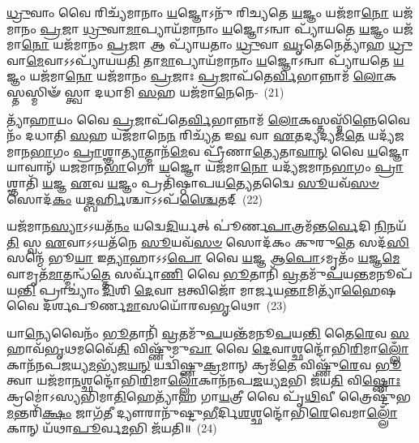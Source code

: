 {\anuvakamend[{\-\ul{𑌦}\-\-\ul{𑌰𑍍}\-\mbox{}\-\ul{𑌶}\-\-\ul{𑌪𑍂}\-\-\ul{𑌰𑍍𑌣}\-\-\ul{𑌮𑌾}\-𑌸𑌯𑍋᳴𑌰𑍁\-\ul{𑌭}\-𑌯𑌤𑍋᳴ 𑌦𑍇\-\ul{𑌵𑌾}\-𑌶𑍍𑌵𑌾𑌃 \ul{𑌸𑍁}\-𑌰𑍇𑌤𑌾𑌃॑ \ul{𑌪𑍍𑌰}\-𑌜𑌾𑌪᳴𑌤𑌿𑌰𑍍𑌮𑌿\-\ul{𑌥𑍁}\-𑌨𑍇𑌨𑌾॑\-𑌽\-𑌽𑌪𑍍𑌨𑍋\-\ul{𑌤𑍍𑌯}\-𑌷𑍍𑌟𑍗 𑌚᳴}]}%

\-\ul{𑌧𑍍𑌰𑍁}\-𑌵𑌾𑌂 𑌵𑍈 𑌰𑌿𑌚𑍍𑌯᳴𑌮𑌾𑌨𑌾𑌂 \ul{𑌯}\-𑌜𑍍𑌞𑍋\-𑌽𑌨𑍁᳴ 𑌰𑌿𑌚𑍍𑌯𑌤𑍇 \ul{𑌯}\-𑌜𑍍𑌞𑌂 𑌯𑌜᳴𑌮𑌾\-\ul{𑌨𑍋} 𑌯𑌜᳴𑌮𑌾𑌨𑌂 \ul{𑌪𑍍𑌰}\-𑌜𑌾 \ul{𑌧𑍍𑌰𑍁}\-𑌵𑌾\-\ul{𑌮𑌾}\-𑌪𑍍𑌯𑌾𑌯᳴𑌮𑌾𑌨𑌾𑌂 \ul{𑌯}\-𑌜𑍍𑌞𑍋\-𑌽𑌨𑍍𑌵𑌾 𑌪𑍍𑌯𑌾᳴𑌯𑌤𑍇 \ul{𑌯}\-𑌜𑍍𑌞𑌂 𑌯𑌜᳴𑌮𑌾\-\ul{𑌨𑍋} 𑌯𑌜᳴𑌮𑌾𑌨𑌂 \ul{𑌪𑍍𑌰}\-𑌜𑌾 𑌆 𑌪𑍍𑌯𑌾᳴𑌯𑌤𑌾𑌂 \ul{𑌧𑍍𑌰𑍁}\-𑌵𑌾 \ul{𑌘𑍃}\-𑌤𑍇𑌨𑍇𑌤𑍍𑌯𑌾᳴𑌹 \ul{𑌧𑍍𑌰𑍁}\-𑌵𑌾\-\ul{𑌮𑍇}\-𑌵𑌾\-𑌽\-𑌽𑌪𑍍𑌯𑌾᳴𑌯𑌯\-\ul{𑌤𑌿} 𑌤𑌾\-\ul{𑌮𑌾}\-𑌪𑍍𑌯𑌾𑌯᳴𑌮𑌾𑌨𑌾𑌂 \ul{𑌯}\-𑌜𑍍𑌞𑍋\-𑌽𑌨𑍍𑌵𑌾 𑌪𑍍𑌯𑌾᳴𑌯𑌤𑍇 \ul{𑌯}\-𑌜𑍍𑌞𑌂 𑌯𑌜᳴𑌮𑌾\-\ul{𑌨𑍋} 𑌯𑌜᳴𑌮𑌾𑌨𑌂 \ul{𑌪𑍍𑌰}\-𑌜𑌾𑌃 \ul{𑌪𑍍𑌰}\-𑌜𑌾𑌪᳴𑌤𑍇\-\ul{𑌰𑍍𑌵𑌿}\-𑌭𑌾𑌨𑍍𑌨𑌾𑌮᳴ \ul{𑌲𑍋}\-𑌕𑌸𑍍𑌤𑌸𑍍𑌮𑌿𑍟᳴ 𑌸𑍍𑌤𑍍𑌵𑌾 𑌦𑌧𑌾𑌮𑌿 \ul{𑌸}\-𑌹 𑌯𑌜᳴𑌮𑌾\-\ul{𑌨𑍇}\-𑌨𑍇-~(21)

𑌤𑍍𑌯𑌾᳴\-\ul{𑌹𑌾}\-𑌯𑌂 𑌵𑍈 \ul{𑌪𑍍𑌰}\-𑌜𑌾𑌪᳴𑌤𑍇\-\ul{𑌰𑍍𑌵𑌿}\-𑌭𑌾𑌨𑍍𑌨𑌾𑌮᳴ \ul{𑌲𑍋}\-𑌕𑌸𑍍𑌤𑌸𑍍𑌮𑌿᳴\-\ul{𑌨𑍍𑌨𑍇}\-𑌵𑍈𑌨𑌂᳴ 𑌦𑌧𑌾𑌤𑌿 \ul{𑌸}\-𑌹 𑌯𑌜᳴𑌮𑌾𑌨𑍇\-\ul{𑌨} 𑌰𑌿𑌚𑍍𑌯᳴𑌤 𑌇\-\ul{𑌵} 𑌵𑌾 \ul{𑌏}\-𑌤𑌦𑍍𑌯𑌦𑍍𑌯𑌜᳴\-\ul{𑌤𑍇} 𑌯𑌦𑍍𑌯᳴𑌜𑌮𑌾𑌨\-\ul{𑌭𑌾}\-𑌗𑌂 \ul{𑌪𑍍𑌰𑌾}\-𑌶𑍍𑌞𑌾\-\ul{𑌤𑍍𑌯𑌾}\-𑌤𑍍𑌮𑌾𑌨᳴\-\ul{𑌮𑍇}\-𑌵 𑌪𑍍𑌰𑍀᳴𑌣𑌾\-\ul{𑌤𑍍𑌯𑍇}\-𑌤𑌾\-\ul{𑌵𑌾}\-\-\ul{𑌨𑍍} 𑌵𑍈 \ul{𑌯}\-𑌜𑍍𑌞𑍋 𑌯𑌾𑌵𑌾𑌨𑍍᳴ 𑌯𑌜𑌮𑌾𑌨\-\ul{𑌭𑌾}\-𑌗𑍋 \ul{𑌯}\-𑌜𑍍𑌞𑍋 𑌯𑌜᳴𑌮𑌾\-\ul{𑌨𑍋} 𑌯𑌦𑍍𑌯᳴𑌜𑌮𑌾𑌨\-\ul{𑌭𑌾}\-𑌗𑌂 \ul{𑌪𑍍𑌰𑌾}\-𑌶𑍍𑌞𑌾𑌤𑌿᳴ \ul{𑌯}\-𑌜𑍍𑌞 \ul{𑌏}\-𑌵 \ul{𑌯}\-𑌜𑍍𑌞𑌂 𑌪𑍍𑌰𑌤𑌿᳴𑌷𑍍𑌠𑌾𑌪𑌯\-\ul{𑌤𑍍𑌯𑍇}\-𑌤𑌦𑍍𑌵𑍈 \ul{𑌸𑍂}\-𑌯𑌵᳴\-\ul{𑌸}\-\-\ul{𑍞} 𑌸𑍋𑌦᳴\-\ul{𑌕𑌂} 𑌯\-\ul{𑌦𑍍𑌬}\-\-\ul{𑌰𑍍}\-\mbox{}𑌹𑌿𑌶𑍍𑌚𑌾\-𑌽\-𑌽𑌪᳴\-\ul{𑌶𑍍𑌚𑍈}\-𑌤𑌦𑍍~(22)

𑌯𑌜᳴𑌮𑌾𑌨\-\ul{𑌸𑍍𑌯𑌾}\-\-𑌽\-𑌽𑌯𑌤᳴\-\ul{𑌨𑌂} 𑌯𑌦𑍍𑌵𑍇\-\ul{𑌦𑌿}\-𑌰𑍍𑌯𑌤𑍍 𑌪𑍂॑𑌰𑍍𑌣\-\ul{𑌪𑌾}\-𑌤𑍍𑌰𑌮᳴𑌨𑍍𑌤\-\ul{𑌰𑍍𑌵𑍇}\-𑌦𑌿 \ul{𑌨𑌿}\-𑌨𑌯᳴\-\ul{𑌤𑌿} 𑌸𑍍𑌵 \ul{𑌏}\-𑌵𑌾\-𑌽\-𑌽𑌯𑌤᳴𑌨𑍇 \ul{𑌸𑍂}\-𑌯𑌵᳴\-\ul{𑌸}\-\-\ul{𑍞} 𑌸𑍋𑌦᳴𑌕𑌂 𑌕𑍁𑌰𑍁\-\ul{𑌤𑍇} 𑌸𑌦᳴\-\ul{𑌸𑌿} 𑌸𑌨𑍍𑌮𑍇᳴ 𑌭𑍂\-\ul{𑌯𑌾} 𑌇\-\ul{𑌤𑍍𑌯𑌾}\-𑌹𑌾\-𑌽\-𑌽\-\ul{𑌪𑍋} 𑌵𑍈 \ul{𑌯}\-𑌜𑍍𑌞 𑌆\-\ul{𑌪𑍋}\-\-𑌽𑌮𑍃𑌤𑌂᳴ \ul{𑌯}\-𑌜𑍍𑌞\-\ul{𑌮𑍇}\-𑌵𑌾𑌮𑍃𑌤᳴\-\ul{𑌮𑌾}\-𑌤𑍍𑌮𑌨𑍍𑌧᳴\-\ul{𑌤𑍍𑌤𑍇} 𑌸𑌰𑍍𑌵𑌾᳴\-\ul{𑌣𑌿} 𑌵𑍈 \ul{𑌭𑍂}\-𑌤𑌾𑌨𑌿᳴ \ul{𑌵𑍍𑌰}\-𑌤𑌮𑍁᳴\-\ul{𑌪}\-𑌯\-\ul{𑌨𑍍𑌤}\-𑌮𑌨𑍂𑌪᳴ 𑌯\-\ul{𑌨𑍍𑌤𑌿} 𑌪𑍍𑌰𑌾𑌚𑍍𑌯𑌾𑌂॑ \ul{𑌦𑌿}\-𑌶𑌿 \ul{𑌦𑍇}\-𑌵𑌾 \ul{𑌋}\-𑌤𑍍𑌵𑌿𑌜𑍋᳴ 𑌮𑌾𑌰𑍍𑌜𑌯\-\ul{𑌨𑍍𑌤𑌾}\-𑌮𑌿𑌤𑍍𑌯𑌾᳴\-\ul{𑌹𑍈}\-𑌷 𑌵𑍈 𑌦᳴𑌰𑍍\mbox{}𑌶𑌪𑍂𑌰𑍍𑌣\-\ul{𑌮𑌾}\-𑌸𑌯𑍋᳴𑌰𑌵\-\ul{𑌭𑍃}\-𑌥𑍋~(23)

𑌯𑌾\-\ul{𑌨𑍍𑌯𑍇}\-𑌵𑍈𑌨𑌂᳴ \ul{𑌭𑍂}\-𑌤𑌾𑌨𑌿᳴ \ul{𑌵𑍍𑌰}\-𑌤𑌮𑍁᳴\-\ul{𑌪}\-𑌯𑌨𑍍𑌤᳴𑌮𑌨𑍂\-\ul{𑌪}\-𑌯\-\ul{𑌨𑍍𑌤𑌿} 𑌤𑍈\-\ul{𑌰𑍇}\-𑌵 \ul{𑌸}\-𑌹𑌾𑌵᳴\-\ul{𑌭𑍃}\-𑌥𑌮𑌵𑍈᳴\-\ul{𑌤𑌿} 𑌵𑌿𑌷𑍍𑌣𑍁᳴𑌮𑍁\-\ul{𑌖𑌾} 𑌵𑍈 \ul{𑌦𑍇}\-𑌵𑌾𑌶𑍍𑌛𑌨𑍍𑌦𑍋᳴𑌭𑌿\-\ul{𑌰𑌿}\-𑌮𑌾\-\ul{𑌲𑍍𑌲𑍋𑌁}\-𑌕𑌾𑌨᳴𑌨𑌪\-\-\ul{𑌜}\-𑌯𑍍𑌯\-\ul{𑌮}\-𑌭𑍍𑌯᳴𑌜\-\ul{𑌯}\-\-\ul{𑌨𑍍} 𑌯𑌦𑍍𑌵𑌿᳴𑌷𑍍𑌣𑍁\-\ul{𑌕𑍍𑌰}\-𑌮𑌾𑌨𑍍 𑌕𑍍𑌰𑌮᳴\-\ul{𑌤𑍇} 𑌵𑌿𑌷𑍍𑌣𑍁᳴\-\ul{𑌰𑍇}\-𑌵 \ul{𑌭𑍂}\-𑌤𑍍𑌵𑌾 𑌯𑌜᳴𑌮𑌾\-\ul{𑌨}\-𑌶𑍍𑌛𑌨𑍍𑌦𑍋᳴𑌭𑌿\-\ul{𑌰𑌿}\-𑌮𑌾\-\ul{𑌲𑍍𑌲𑍋𑌁}\-𑌕𑌾𑌨᳴𑌨𑌪\-\ul{𑌜}\-𑌯𑍍𑌯\-\ul{𑌮}\-𑌭𑌿 𑌜᳴𑌯\-\ul{𑌤𑌿} 𑌵𑌿\-\ul{𑌷𑍍𑌣𑍋𑌃} 𑌕𑍍𑌰𑌮𑍋॑\-𑌽𑌸𑍍𑌯𑌭𑌿𑌮𑌾\-\ul{𑌤𑌿}\-𑌹𑍇𑌤𑍍𑌯𑌾᳴𑌹 𑌗𑌾\-\ul{𑌯}\-𑌤𑍍𑌰𑍀 𑌵𑍈 𑌪𑍃᳴\-\ul{𑌥𑌿}\-𑌵𑍀 𑌤𑍍𑌰𑍈𑌷𑍍𑌟𑍁᳴𑌭\-\ul{𑌮}\-𑌨𑍍𑌤𑌰𑌿᳴\-\ul{𑌕𑍍𑌷𑌂} 𑌜𑌾𑌗᳴\-\ul{𑌤𑍀} 𑌦𑍍𑌯𑍗𑌰𑌾𑌨𑍁᳴𑌷𑍍𑌟𑍁\-\ul{𑌭𑍀}\-𑌰𑍍𑌦𑌿\-\ul{𑌶}\-𑌶𑍍𑌛𑌨𑍍𑌦𑍋᳴𑌭𑌿\-\ul{𑌰𑍇}\-𑌵𑍇𑌮𑌾\-\ul{𑌲𑍍𑌲𑍋𑌁}\-𑌕𑌾𑌨𑍍 𑌯᳴𑌥𑌾\-\ul{𑌪𑍂}\-𑌰𑍍𑌵\-\ul{𑌮}\-𑌭𑌿 𑌜᳴𑌯𑌤𑌿॥~(24)

